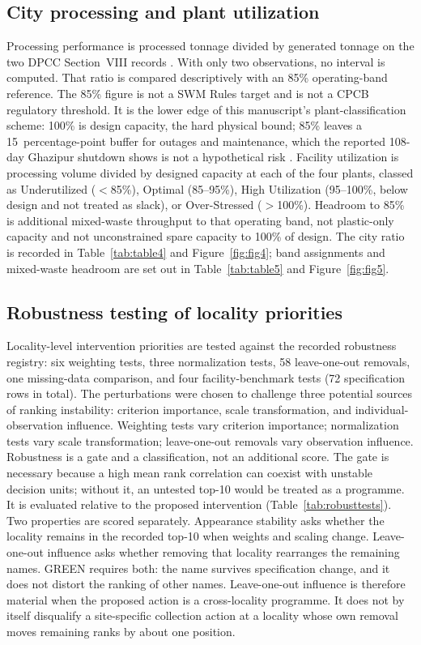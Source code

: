 \documentclass[12pt,a4paper]{article}
\begin{document}
\subsection{City processing and plant utilization}

Processing performance is processed tonnage divided by generated tonnage on the two DPCC Section~VIII records \citep{dpcc_mpr_2025}. With only two observations, no interval is computed. That ratio is compared descriptively with an 85\% operating-band reference. The 85\% figure is not a SWM Rules target and is not a CPCB regulatory threshold. It is the lower edge of this manuscript's plant-classification scheme: 100\% is design capacity, the hard physical bound; 85\% leaves a 15~percentage-point buffer for outages and maintenance, which the reported 108-day Ghazipur shutdown shows is not a hypothetical risk \citep{ht_ghazipur_shutdown_2026}. Facility utilization is processing volume divided by designed capacity at each of the four plants, classed as Underutilized ($<$85\%), Optimal (85--95\%), High Utilization (95--100\%, below design and not treated as slack), or Over-Stressed ($>$100\%). Headroom to 85\% is additional mixed-waste throughput to that operating band, not plastic-only capacity and not unconstrained spare capacity to 100\% of design. The city ratio is recorded in Table~\ref{tab:table4} and Figure~\ref{fig:fig4}; band assignments and mixed-waste headroom are set out in Table~\ref{tab:table5} and Figure~\ref{fig:fig5}.

\subsection{Robustness testing of locality priorities}

Locality-level intervention priorities are tested against the recorded robustness registry: six weighting tests, three normalization tests, 58 leave-one-out removals, one missing-data comparison, and four facility-benchmark tests (72 specification rows in total). The perturbations were chosen to challenge three potential sources of ranking instability: criterion importance, scale transformation, and individual-observation influence. Weighting tests vary criterion importance; normalization tests vary scale transformation; leave-one-out removals vary observation influence. Robustness is a gate and a classification, not an additional score. The gate is necessary because a high mean rank correlation can coexist with unstable decision units; without it, an untested top-10 would be treated as a programme. It is evaluated relative to the proposed intervention (Table~\ref{tab:robusttests}). Two properties are scored separately. Appearance stability asks whether the locality remains in the recorded top-10 when weights and scaling change. Leave-one-out influence asks whether removing that locality rearranges the remaining names. GREEN requires both: the name survives specification change, and it does not distort the ranking of other names. Leave-one-out influence is therefore material when the proposed action is a cross-locality programme. It does not by itself disqualify a site-specific collection action at a locality whose own removal moves remaining ranks by about one position.
\end{document}

